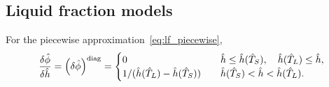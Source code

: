 \documentclass{article}
\newcommand{\diag}[1]{\qty(#1)^\mathrm{diag}}
\begin{document}
\subsection{Liquid fraction models}

For the piecewise approximation~\eqref{eq:lf_piecewise},
\begin{equation}
	\fdv{\hat{\phi}}{\hat{h}} = \diag{\var{\hat{\phi}}} = \begin{cases}
        0 & \quad \hat{h} \leq \hat{h}(\hat{T}_S), \quad \hat{h}(\hat{T}_L) \leq \hat{h}, \\
        1/(\hat{h}(\hat{T}_L)-\hat{h}(\hat{T}_S)) & \quad \hat{h}(\hat{T}_S) < \hat{h} < \hat{h}(\hat{T}_L). \\
    \end{cases} \label{eq:pert_phi_h_diag}
\end{equation}
\end{document}
